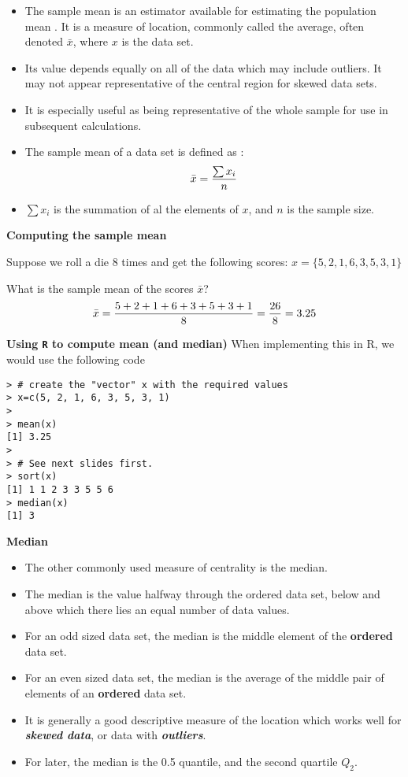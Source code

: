 \documentclass[]{report}
\begin{document}
\begin{itemize}
	\item The sample mean is an estimator available for estimating the population mean . It is a measure of location, commonly called the average, often denoted $\bar{x}$, where $x$ is the data set.
	\item
	Its value depends equally on all of the data which may include outliers. It may not appear representative of the central region for skewed data sets.
	\item
	It is especially useful as being representative of the whole sample for use in subsequent calculations.
	\item The sample mean of a data set is defined as :
	\[ \bar{x} = { \sum x_i\over n}\]
	\item $\sum x_i$ is the summation of al the elements of $x$, and $n$ is the sample size.
\end{itemize}

\noindent \textbf{Computing the sample mean}

Suppose we roll a die 8 times and get the following scores: $x = \{ 5, 2, 1, 6, 3, 5, 3, 1\}$ \\ \bigskip

What is the sample mean of the scores $\bar{x}$?
\[ \bar{x}  = {5 + 2 +  1 +  6 +  3 +  5 +  3 +  1 \over 8 } = {26 \over 8} =  3.25 \]




\noindent \textbf{Using \texttt{R} to compute mean (and median)}
When implementing this in R, we would use the following code

\begin{verbatim}
> # create the "vector" x with the required values
> x=c(5, 2, 1, 6, 3, 5, 3, 1)
>
> mean(x)
[1] 3.25
>
> # See next slides first.
> sort(x)
[1] 1 1 2 3 3 5 5 6
> median(x)
[1] 3
\end{verbatim}


\noindent \textbf{Median}
\begin{itemize}
	\item The other commonly used measure of centrality is the median.
	
	\item The median is the value halfway through the ordered data set, below and above which there lies an equal number of data values.
	\item For an odd sized data set, the median is the middle element of the \textbf{ordered} data set.
	\item For an even sized data set, the median is the average of the middle pair of elements of an \textbf{ordered} data set.
	\item It is generally a good descriptive measure of the location which works well for \textbf{\emph{skewed data}}, or data with \textbf{\emph{outliers}}.
	
	\item For later, the median is the 0.5 quantile, and the second quartile $Q_2$.
\end{itemize}
\end{document}
